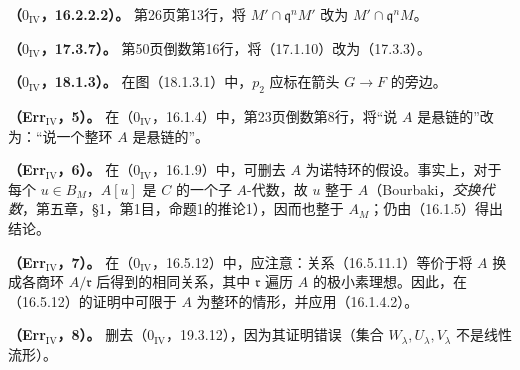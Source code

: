 
\hypertarget{ErrIV:A16222}{}\noindent\textbf{（$0_{\mathrm{IV}}$，16.2.2.2）。}
第26页第13行，将 $M'\cap\mathfrak q^nM'$ 改为 $M'\cap\mathfrak q^nM$。

\medskip
\hypertarget{ErrIV:A1737}{}\noindent\textbf{（$0_{\mathrm{IV}}$，17.3.7）。}
第50页倒数第16行，将（17.1.10）改为（17.3.3）。

\medskip
\hypertarget{ErrIV:A1813}{}\noindent\textbf{（$0_{\mathrm{IV}}$，18.1.3）。}
在图（18.1.3.1）中，$p_2$ 应标在箭头 $G\to F$ 的旁边。

\hypertarget{ErrIV:5}{}
\noindent\textbf{（Err$_{\mathrm{IV}}$，5）。}
在（$0_{\mathrm{IV}}$，16.1.4）中，第23页倒数第8行，将“说 $A$ 是悬链的”改为：“说一个整环 $A$ 是悬链的”。

\medskip
\hypertarget{ErrIV:6}{}
\noindent\textbf{（Err$_{\mathrm{IV}}$，6）。}
在（$0_{\mathrm{IV}}$，16.1.9）中，可删去 $A$ 为诺特环的假设。事实上，对于每个 $u\in B_M$，$A[u]$ 是 $C$ 的一个子 $A$-代数，故 $u$ 整于 $A$（Bourbaki，\textit{交换代数}，第五章，§1，第1目，命题1的推论1），因而也整于 $A_M$；仍由（16.1.5）得出结论。

\medskip
\hypertarget{ErrIV:7}{}
\noindent\textbf{（Err$_{\mathrm{IV}}$，7）。}
在（$0_{\mathrm{IV}}$，16.5.12）中，应注意：关系（16.5.11.1）等价于将 $A$ 换成各商环 $A/\mathfrak r$ 后得到的相同关系，其中 $\mathfrak r$ 遍历 $A$ 的极小素理想。因此，在（16.5.12）的证明中可限于 $A$ 为整环的情形，并应用（16.1.4.2）。


\medskip
\hypertarget{ErrIV:8}{}
\noindent\textbf{（Err$_{\mathrm{IV}}$，8）。}
删去（$0_{\mathrm{IV}}$，19.3.12），因为其证明错误（集合 $W_\lambda,U_\lambda,V_\lambda$ 不是线性流形）。
